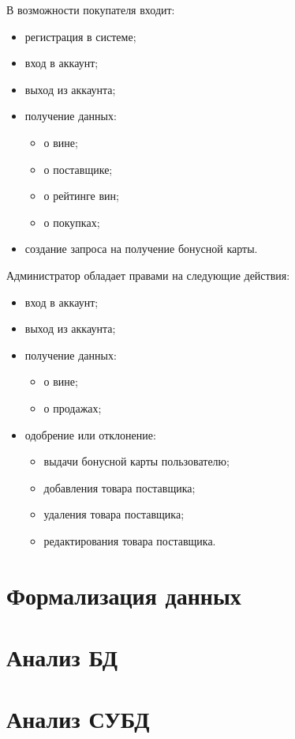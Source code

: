 В возможности покупателя входит:

\begin{itemize}
	\item регистрация в системе;
	\item вход в аккаунт;
	\item выход из аккаунта;
	\item получение данных:
		\begin{itemize}
			\item о вине;
			\item о поставщике;
			\item о рейтинге вин;
			\item о покупках;
		\end{itemize}
	\item создание запроса на получение бонусной карты.
\end{itemize}

Администратор обладает правами на следующие действия:

\begin{itemize}
	\item вход в аккаунт;
	\item выход из аккаунта;
	\item получение данных:
		\begin{itemize}
			\item о вине;
			\item о продажах;
		\end{itemize}
	\item одобрение или отклонение:
		\begin{itemize}
			\item выдачи бонусной карты пользователю;
			\item добавления товара поставщика;
			\item удаления товара поставщика;
			\item редактирования товара поставщика.
		\end{itemize}
\end{itemize}

\section{Формализация данных}

\section{Анализ БД}

\section{Анализ СУБД}


